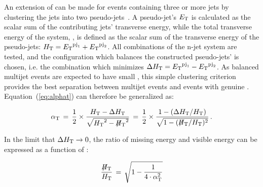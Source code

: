 An extension of \alphat can be made for events containing three or more jets
by clustering the jets into two pseudo-jets~\cite{cms-pas-sus-09001}. 
A pseudo-jet's ${E_{\text T}}$ is calculated as the scalar sum of the contributing 
jets' transverse energy, while the total transverse energy of the system, \scalht, 
is defined as the scalar sum of the transverse energy of the pseudo-jets: 
$\mbox{$H_\text{T}$} = {E_{\text T}}^{{\rm pj}_1}+{E_{\text T}}^{{\rm pj}_2}$.
All combinations of the n-jet system are tested, and the configuration which
balances the constructed pseudo-jets' \Et is chosen, i.e. the combination which
minimizes $\Delta\mbox{$H_\text{T}$} = {E_{\text T}}^{{\rm pj}_1}-{E_{\text T}}^{{\rm pj}_2}$. As balanced multijet events
are expected to have small \dht, this simple clustering criterion provides the best
separation between multijet events and events with genuine \met. 
Equation~(\ref{eq:alphat}) can therefore be generalized as:

\begin{equation}
  \label{eq:alphat2}
  \alpha_{\text{T}}\, = \,\frac{1}{2} \times \frac{\mbox{$H_\text{T}$} -
    \Delta\mbox{$H_\text{T}$}}{\sqrt{\mbox{$H_\text{T}$}^2 - \mbox{$\not\!\!H_\text{T}$}^2}} \, = \,\frac{1}{2} \times 
  \frac{1 - (\Delta\mbox{$H_\text{T}$}/\mbox{$H_\text{T}$})}{\sqrt{1 - (\mbox{$\not\!\!H_\text{T}$}/\mbox{$H_\text{T}$})^2}} \, . 
\end{equation}

In the limit that  $\Delta\mbox{$H_\text{T}$} \rightarrow 0$, the ratio of missing energy and
visible energy can be expressed as a function of \alphat:

\begin{equation}
  \label{eq:alphat3}
  \frac{\mbox{$\not\!\!H_\text{T}$}}{\mbox{$H_\text{T}$}} \, = \, \sqrt{ 1 - \frac{1}{4 \cdot \alpha_{\text{T}}^2} }
\end{equation}

